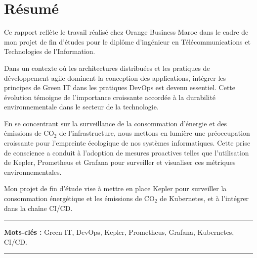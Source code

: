 \chapter*{Résumé}


Ce rapport reflète le travail réalisé chez Orange Business Maroc dans le cadre de mon projet de fin d'études pour le diplôme d'ingénieur en Télécommunications et Technologies de l'Information.

Dans un contexte où les architectures distribuées et les pratiques de développement agile dominent la conception des applications, intégrer les principes de Green IT dans les pratiques DevOps est devenu essentiel. Cette évolution témoigne de l'importance croissante accordée à la durabilité environnementale dans le secteur de la technologie.

En se concentrant sur la surveillance de la consommation d'énergie et des émissions de CO$_2$ de l'infrastructure, nous mettons en lumière une préoccupation croissante pour l'empreinte écologique de nos systèmes informatiques. Cette prise de conscience a conduit à l'adoption de mesures proactives telles que l'utilisation de Kepler, Prometheus et Grafana pour surveiller et visualiser ces métriques environnementales.

Mon projet de fin d'étude vise à mettre en place Kepler pour surveiller la consommation énergétique et les émissions de CO$_2$ de Kubernetes, et à l'intégrer dans la chaîne CI/CD.

\noindent\rule[2pt]{\textwidth}{0.5pt}

{\textbf{Mots-clés :}}
Green IT, DevOps, Kepler, Prometheus, Grafana, Kubernetes, CI/CD.

\noindent\rule[2pt]{\textwidth}{0.5pt}